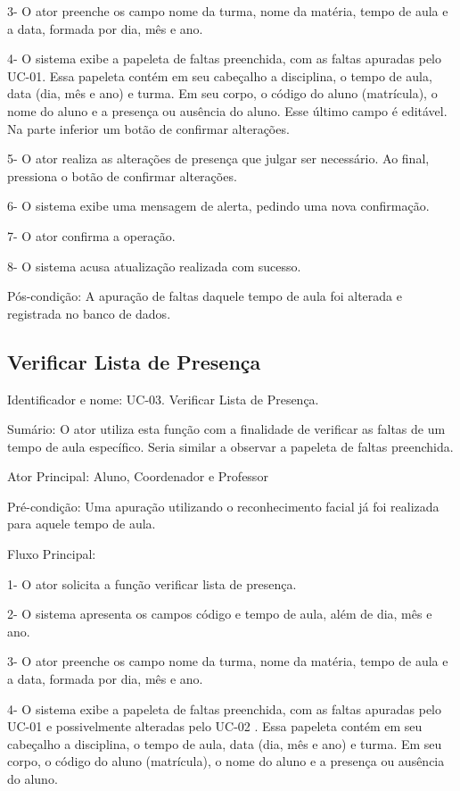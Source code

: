 3- O ator preenche os campo nome da turma, nome da matéria, tempo de aula e a data, formada por dia, mês e ano.

4- O sistema exibe a papeleta de faltas preenchida, com as faltas apuradas pelo UC-01. Essa papeleta contém em seu cabeçalho a disciplina, o tempo de aula, data (dia, mês e ano) e turma. Em seu corpo, o código do aluno (matrícula), o nome do aluno e a presença ou ausência do aluno. Esse último campo é editável. Na parte inferior um botão de confirmar alterações.

5- O ator realiza as alterações de presença que julgar ser necessário. Ao final, pressiona o botão  de confirmar alterações.

6- O sistema exibe uma mensagem de alerta, pedindo uma nova confirmação. 

7- O ator confirma a operação.

8- O sistema acusa atualização realizada com sucesso.

Pós-condição: A apuração de faltas daquele tempo de aula foi alterada e registrada no banco de dados.


\subsection{Verificar Lista de Presença} 
\noindent
Identificador e nome: UC-03. Verificar Lista de Presença.

Sumário: O ator utiliza esta função com a finalidade de verificar as faltas de um tempo de aula específico. Seria similar a observar a papeleta de faltas preenchida.

Ator Principal: Aluno, Coordenador  e Professor

Pré-condição: Uma apuração utilizando o reconhecimento facial já foi realizada para aquele tempo de aula.

Fluxo Principal:

1- O ator solicita a função verificar lista de presença.

2- O sistema apresenta os campos código e tempo de aula, além de dia, mês e ano.

3- O ator preenche os campo nome da turma, nome da matéria, tempo de aula e a data, formada por dia, mês e ano.

4- O sistema exibe a papeleta de faltas preenchida, com as faltas apuradas pelo UC-01 e possivelmente alteradas pelo UC-02 . Essa papeleta contém em seu cabeçalho a disciplina, o tempo de aula, data (dia, mês e ano) e turma. Em seu corpo, o código do aluno (matrícula), o nome do aluno e a presença ou ausência do aluno.

